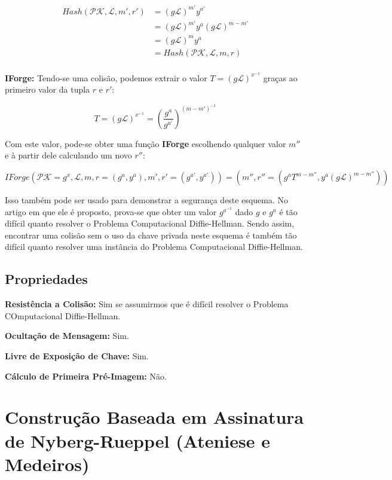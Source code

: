 \documentclass[a4paper]{article}
\begin{document}
\begin{equation}
\begin{split}
  Hash(\mathcal{PK},\mathcal{L}, m', r') &= (g\mathcal{L})^{m'}y^{a'}\\
  &= (g\mathcal{L})^{m'}y^{a}(g\mathcal{L})^{m-m'}\\
  &= (g\mathcal{L})^{m}y^{a}\\
  &= Hash(\mathcal{PK},\mathcal{L}, m, r)\\
\end{split}
\end{equation}

\textbf{IForge:} Tendo-se uma colisão, podemos extrair o valor $T =
(g\mathcal{L})^{x^{-1}}$ graças ao primeiro valor da tupla $r$ e $r'$:

$$
T = (g\mathcal{L})^{x^{-1}} = \left(\frac{g^a}{g^{a'}}\right)^{(m-m')^{-1}}
$$

Com este valor, pode-se obter uma função \textbf{IForge} escolhendo
qualquer valor $m''$ e à partir dele calculando um novo $r''$:

$$ IForge(\mathcal{PK}=g^x, \mathcal{L}, m, r=(g^a, y^a), m',
r'=(g^{a'}, y^{a'})) = (m'', r''=(g^aT^{m-m''},
y^{a}(g\mathcal{L})^{m-m''}))
$$

Isso também pode ser usado para demonstrar a segurança deste
esquema. No artigo em que ele é proposto, prova-se que obter um valor
$g^{a^{-1}}$ dado $g$ e $g^a$ é tão difícil quanto resolver o Problema
Computacional Diffie-Hellman. Sendo assim, encontrar uma colisão sem o
uso da chave privada neste esquema é também tão difícil quanto
resolver uma instância do Problema Computacional Diffie-Hellman.

\subsection{Propriedades}

\textbf{Resistência a Colisão: }Sim se assumirmos que é difícil resolver o Problema COmputacional Diffie-Hellman.

\textbf{Ocultação de Mensagem: }Sim.

\textbf{Livre de Exposição de Chave: } Sim.

\textbf{Cálculo de Primeira Pré-Imagem: }Não.

\section{Construção Baseada em Assinatura de Nyberg-Rueppel (Ateniese e Medeiros) \cite{ateniese}}
\end{document}
